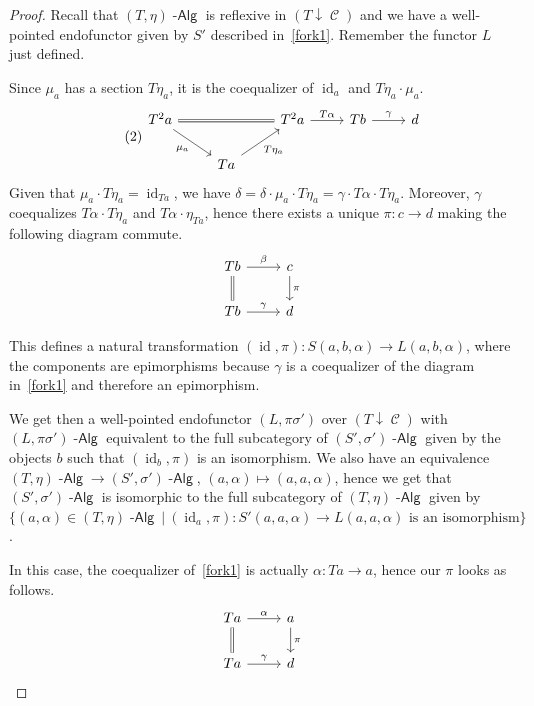 \documentclass[a4paper,11pt,oneside,openany]{scrbook}
\DeclareMathOperator{\Alg}{-\mathsf{Alg}}
\DeclareMathOperator{\C}{\mathcal{C}}
\DeclareMathOperator{\id}{id}
\theoremstyle{definition}
\theoremstyle{definition}
\begin{document}
\begin{proof}
    Recall that $(T,\eta)\Alg$ is reflexive in $(T\downarrow\C)$ and we have a well-pointed endofunctor given by $S'$ described in~\ref{fork1}. Remember the functor $L$ just defined.
    
    Since $\mu_a$ has a section $T\eta_a$, it is the coequalizer of $\id_a$ and $T\eta_a\cdot\mu_a$.
    \[
    \tag{2}\label{fork2}
    \begin{tikzcd}
    T^2a\ar[rr, equal]\ar[dr, swap, "\mu_a"]
    && T^2a\ar[r, "T\alpha"]
    & Tb\ar[r, "\gamma"]
    & d \\
    & Ta\ar[ur, swap, "T\eta_a"]
    \end{tikzcd}
    \]
    Given that $\mu_a\cdot T\eta_a=\id_{Ta}$, we have $\delta=\delta\cdot\mu_a\cdot T\eta_a=\gamma\cdot T\alpha\cdot T\eta_a$. Moreover, $\gamma$ coequalizes $T\alpha\cdot T\eta_a$ and $T\alpha\cdot\eta_{Ta}$, hence there exists a unique $\pi\colon c\rightarrow d$ making the following diagram commute.
    \[
    \begin{tikzcd}
        Tb\ar[d, equal]\ar[r, "\beta"]
        & c\ar[d, "\pi"] \\
        Tb\ar[r, "\gamma"]
        & d
    \end{tikzcd}
    \]
    
    This defines a natural transformation $(\id,\pi)\colon S(a,b,\alpha)\rightarrow L(a,b,\alpha)$, where the components are epimorphisms because $\gamma$ is a coequalizer of the diagram in~\ref{fork1} and therefore an epimorphism.
    
    We get then a well-pointed endofunctor $(L,\pi\sigma')$ over $(T\downarrow\C)$ with $(L,\pi\sigma')\Alg$ equivalent to the full subcategory of $(S',\sigma')\Alg$ given by the objects $b$ such that $(\id_b,\pi)$ is an isomorphism. We also have an equivalence $(T,\eta)\Alg\rightarrow (S',\sigma')\Alg$, $(a,\alpha)\mapsto (a,a,\alpha)$, hence we get that $(S',\sigma')\Alg$ is isomorphic to the full subcategory of $(T,\eta)\Alg$ given by $\{(a,\alpha)\in (T,\eta)\Alg\ |\ (\id_a,\pi)\colon S'(a,a,\alpha)\rightarrow L(a,a,\alpha)\text{ is an isomorphism}\}$.
    
    In this case, the coequalizer of~\ref{fork1} is actually $\alpha\colon Ta\rightarrow a$, hence our $\pi$ looks as follows.
    \[
    \begin{tikzcd}
        Ta\ar[d, equal]\ar[r, "\alpha"]
        & a\ar[d, "\pi"] \\
        Ta\ar[r, "\gamma"]
        & d
    \end{tikzcd}
    \]
    

\end{proof}
\end{document}
